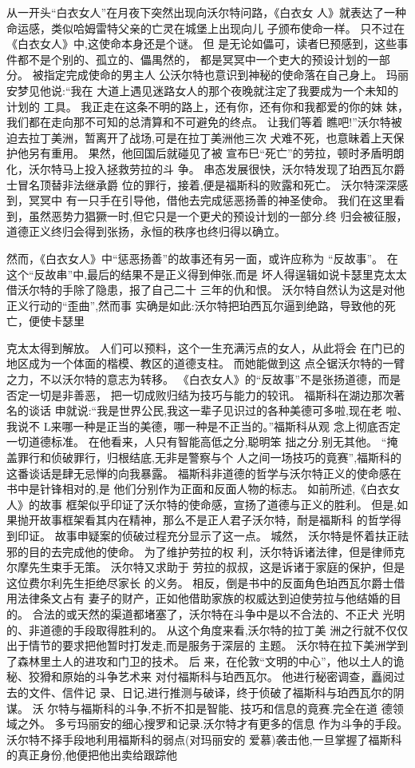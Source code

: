 \documentclass[portrait,a4paper]{article}
\begin{document}
从一开头“白衣女人”在月夜下突然出现向沃尔特问路，《白衣女
人》就表达了一种命运感，类似哈姆雷特父亲的亡灵在城堡上出现向儿
子颁布使命一样。 只不过在《白衣女人》中,这使命本身还是个谜。 但
是无论如儡可，读者巳预感到，这些事件都不是个别的、孤立的、儡禺然的，
都是冥冥中一个吏大的预设计划的一部分。 被指定完成使命的男主人
公沃尔特也意识到神秘的使命落在自己身上。 玛丽安梦见他说:“我在
大道上遇见迷路女人的那个夜晚就注定了我要成为一个未知的计划的
工具。 我正走在这条不明的路上，还有你，还有你和我都爱的你的妹
妹，我们都在走向那不可知的总清算和不可避免的终点。 让我们等着
瞧吧!”沃尔特被迫去拉丁美洲，暂离开了战场,可是在拉丁美洲他三次
犬难不死，也意昧着上天保护他另有重用。 果然，他回国后就碰见了被
宣布巳“死亡”的劳拉，顿时矛盾明朗化，沃尔特马上投入拯救劳拉的斗
争。 串态发展很快，沃尔特发现了珀西瓦尔爵士冒名顶替非法继承爵
位的罪行，接着,便是福斯科的败露和死亡。 沃尔特深深感到，冥冥中
有一只手在引导他，借他去完成惩恶扬善的神圣使命。 我们在这里看
到，虽然恶势力猖獗一时,但它只是一个更犬的预设计划的一部分.终
归会被征服，道德正义终归会得到张扬，永恒的秩序也终归得以确立。

然而，《白衣女人》中“惩恶扬善”的故事还有另一面，或许应称为
“反故事”。 在这个“反故串”中,最后的结果不是正义得到伸张,而是
坏人得逞辑如说卡瑟里克太太借沃尔特的手除了隐患，报了自己二十
三年的仇和恨。 沃尔特自然认为这是对他正义行动的“歪曲”,然而事
实确是如此:沃尔特把珀西瓦尔逼到绝路，导致他的死亡，便使卡瑟里

克太太得到解放。 人们可以预料，这个一生充满污点的女人，从此将会
在门已的地区成为一个体面的楷模、教区的道德支柱。 而她能做到这
点仝锯沃尔特的一臂之力，不以沃尔特的意志为转移。
《白衣女人》的“反故事”不是张扬道德，而是否定一切是非善恶，
把一切成败归结为技巧与能力的较讯。 福斯科在湖边那次著名的谈话
申就说:“我是世界公民,我这一辈子见识过的各种美德可多啦,现在老
啦、我说不 L来哪一种是正当的美德，哪一种是不正当的。”福斯科从观
念上彻底否定一切道德标准。 在他看来，人只有智能高低之分,聪明笨
拙之分.别无其他。 “掩盖罪行和侦破罪行，归根结底,无非是警察与个
人之间一场技巧的竟赛”,福斯科的这番谈话是肆无忌惮的向我暴露。
福斯科非道德的哲学与沃尔特正义的使命感在书中是针锋相对的,是
他们分别作为正面和反面人物的标志。 如前所述,《白衣女人》的故事
框架似乎印证了沃尔特的使命感，宣扬了道德与正义的胜利。 但是,如
果抛开故事框架看其内在精神，那么不是正人君子沃尔特，耐是福斯科
的哲学得到印证。 故事申疑案的侦破过程充分显示了这一点。 城然，
沃尔特是怀着扶正祛邪的目的去完成他的使命。 为了维护劳拉的权
利，沃尔特诉诸法律，但是律师克尔摩先生束手无策。 沃尔特又求助于
劳拉的叔叔，这是诉诸于家庭的保护，但是这位费尔利先生拒绝尽家长
的义务。 相反，倒是书中的反面角色珀西瓦尔爵士借用法律条文占有
妻子的财产，正如他借助家族的权威达到迫使劳拉与他结婚的目的。
合法的或天然的渠道都堵塞了，沃尔特在斗争中是以不合法的、不正犬
光明的、非道德的手段取得胜利的。 从这个角度来看,沃尔特的拉丁美
洲之行就不仅仅出于情节的要求把他暂时打发走,而是服务于深层的
主题。 沃尔特在拉下美洲学到了森林里土人的进攻和门卫的技术。 后
来，在伦敦“文明的中心”，他以土人的诡秘、狡猾和原始的斗争艺术来
对付福斯科与珀西瓦尔。 他进行秘密调查，矗阅过去的文件、信件记
录、日记,进行推测与破译，终于侦破了福斯科与珀西瓦尔的阴谋。 沃
尔特与福斯科的斗争,不折不扣是智能、技巧和信息的竟赛.完全在道
德领域之外。 多亏玛丽安的细心搜罗和记录.沃尔特才有更多的信息
作为斗争的手段。 沃尔特不择手段地利用福斯科的弱点(对玛丽安的
爱慕)袭击他,一旦掌握了福斯科的真正身份,他便把他出卖给跟踪他
\end{document}
